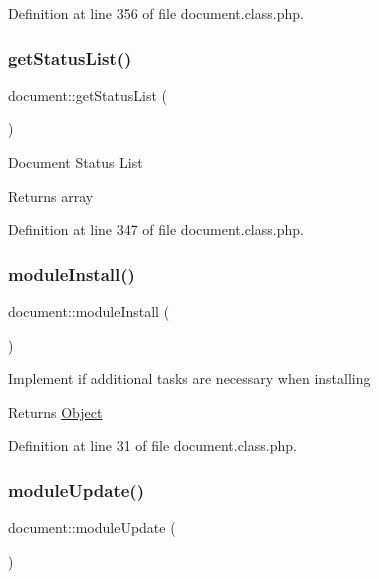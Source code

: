 Definition at line 356 of file document.\+class.\+php.

\mbox{\label{classdocument_ae90cc64e28afdfa204844ed6d03b40e7}} 
\subsubsection{\texorpdfstring{get\+Status\+List()}{getStatusList()}}
{\footnotesize\ttfamily document\+::get\+Status\+List (\begin{DoxyParamCaption}{ }\end{DoxyParamCaption})}

Document Status List \begin{DoxyReturn}{Returns}
array 
\end{DoxyReturn}


Definition at line 347 of file document.\+class.\+php.

\mbox{\label{classdocument_a712db6c7542d0ec2cfdde35583a3b7ba}} 
\subsubsection{\texorpdfstring{module\+Install()}{moduleInstall()}}
{\footnotesize\ttfamily document\+::module\+Install (\begin{DoxyParamCaption}{ }\end{DoxyParamCaption})}

Implement if additional tasks are necessary when installing \begin{DoxyReturn}{Returns}
\hyperlink{classObject}{Object} 
\end{DoxyReturn}


Definition at line 31 of file document.\+class.\+php.

\mbox{\label{classdocument_ad0568fe26b80e3bc328a3fae4997354c}} 
\subsubsection{\texorpdfstring{module\+Update()}{moduleUpdate()}}
{\footnotesize\ttfamily document\+::module\+Update (\begin{DoxyParamCaption}{ }\end{DoxyParamCaption})}

